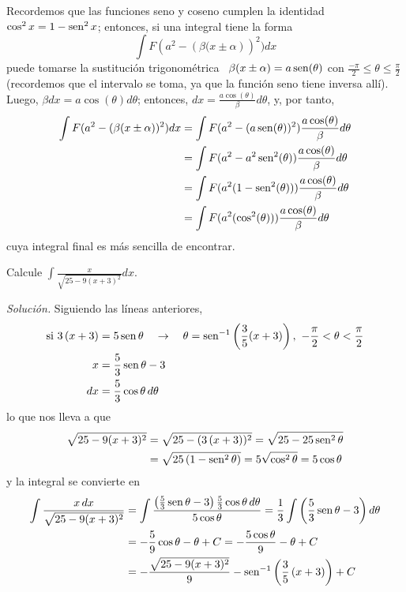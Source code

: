 Recordemos que las funciones seno y coseno cumplen la identidad $\cos^2x=1-\operatorname{sen}^2x$; entonces, si una integral tiene la forma
\[
\int F(a^{2}-\left( \beta(x\pm \alpha\right) )^{2})dx
\]
puede tomarse la sustitución trigonométrica \ $\beta(x\pm \alpha)=a\operatorname{sen}
(\theta )$ con $\frac{-\pi }{2}\leq \theta \leq \frac{\pi }{2}$ (recordemos que el intervalo se toma, ya que la
función seno tiene inversa allí). Luego, $\beta dx=a\cos (\theta )d\theta$; entonces, $dx=\frac{a\cos (\theta )}{\beta}%
d\theta $, y, por tanto,
\begin{align*}
\int F(a^{2}-\left( \beta(x\pm \alpha\right) )^{2})dx &= \int F(a^{2}-(a\operatorname{sen}
(\theta ))^{2})\frac{a\cos (\theta )}{\beta}d\theta \\
&= \int F(a^{2}-a^{2}\operatorname{sen} ^{2}(\theta ))\frac{a\cos (\theta )}{\beta}d\theta
\\
&= \int F(a^{2}(1-\operatorname{sen} ^{2}(\theta )))\frac{a\cos (\theta )}{\beta}d\theta \\
&= \int F(a^{2}(\cos ^{2}(\theta )))\frac{a\cos (\theta )}{\beta}d\theta
\end{align*}
cuya integral final es más sencilla de encontrar.

\enlargethispage*{\baselineskip}

\begin{ejemplo}
Calcule $\int \frac{x}{\sqrt{25-9(x+3)^{2}}}dx$.
\end{ejemplo}

\emph{Solución.} Siguiendo las líneas anteriores,
\begin{align*}
\text{si }3\left( x+3\right) &=5\operatorname{sen}\theta\quad \rightarrow\quad \theta =\operatorname{sen}^{-1} \left(\frac{3}{5}(x+3)\right),\ -\frac{\pi }{2}< \theta < \frac{\pi
}{2}\\
x&=\frac{5}{3}\operatorname{sen}\theta -3\\
dx&=\frac{5}{3}\cos \theta\,d\theta
\end{align*}
lo que nos lleva a que
\begin{align*}
\sqrt{25-9(x+3)^{2}}&=\sqrt{25-(3\left( x+3\right) )^{2}}=\sqrt{%
25-25\sen^{2}\theta }\\
&=\sqrt{25\left( 1-\sen^{2}\theta \right) }=5\sqrt{\cos
^{2}\theta }=5\cos \theta
\end{align*}
y la integral se convierte en
\begin{gather*}
\begin{aligned}
  \int \frac{x\,dx}{\sqrt{25-9(x+3)^{2}}}&=\int \frac{\left( \frac{5}{3}\operatorname{sen}\theta -3\right) \frac{5}{3}\cos \theta\,d\theta }{5\cos \theta }=\frac{1}{3}\int \left( \frac{5}{3}\operatorname{sen}\theta -3\right) d\theta\\
  &=-\frac{5}{9}\cos\theta-\theta+C =-\frac{5\cos\theta}{9}-\theta+C \\
  &=-\frac{\sqrt{25-9(x+3)^{2}}}{9}-\operatorname{sen}^{-1}\left( \frac{3}{5}\left( x+3\right) \right) +C
\end{aligned}
\end{gather*}


